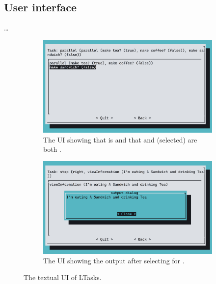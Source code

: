 
\subsection{User interface}
\dots

\begin{figure}[ht]
\centering
\begin{subfigure}{\textwidth}
    \centering
    \includegraphics[width=\textwidth]{img/screenshot-ltasks-breakfast.png}
    \caption{The UI showing that  is  and that  and  (selected) are both .}
    \label{fig:comparison_ltask_ui_1}
\end{subfigure}
\begin{subfigure}{\textwidth}
    \centering
    \bigskip
    \includegraphics[width=\textwidth]{img/screenshot-ltasks-breakfast-view.png}
    \caption{The UI showing the output after selecting  for .}
    \label{fig:comparison_ltask_ui_2}
\end{subfigure}
\caption{The textual UI of LTasks.}
\label{lst:comparison_ltask_ui}
\end{figure}
